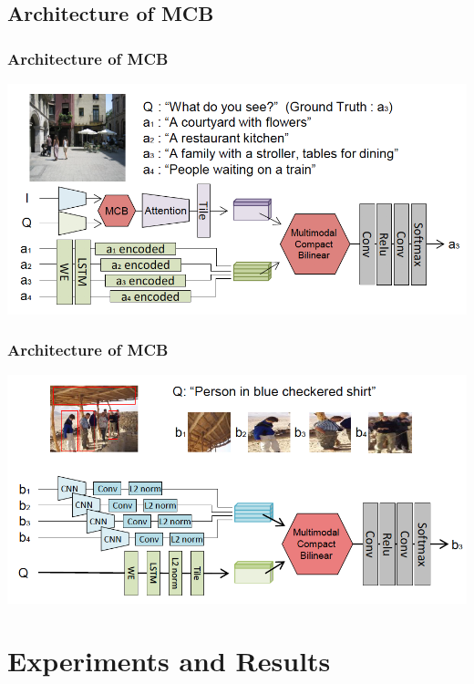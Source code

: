 \documentclass{beamer}
\begin{document}

\subsection{Architecture of MCB}
\begin{frame}
\frametitle{Architecture of MCB}
\begin{center}
\includegraphics[scale=0.65]{./images/MCB_Architecture01}
\end{center}
\end{frame}
\begin{frame}
\frametitle{Architecture of MCB}
\begin{center}
\includegraphics[scale=0.65]{./images/MCB_Architecture02}
\end{center}
\end{frame}

\section{Experiments and Results} 
\end{document}
